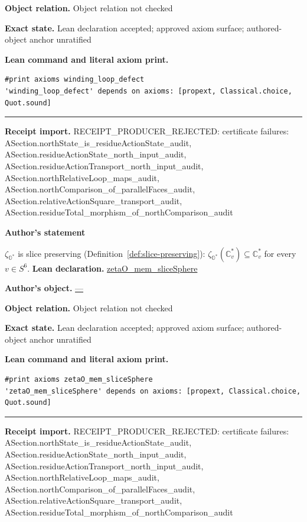 \documentclass[11pt]{article}
\newcommand{\OO}{\mathbb{O}}
\newcommand{\CC}{\mathbb{C}}
\newcommand{\Ostar}{\OO^{*}}
\newcommand{\zetaO}{\zeta_{\Ostar}}
\theoremstyle{plain}
\theoremstyle{definition}
\theoremstyle{remark}
\begin{document}
\begin{tcolorbox}
\par\textbf{Object relation.} Object relation not checked
\par\textbf{Exact state.} Lean declaration accepted; approved axiom surface; authored-object anchor unratified
\par\smallskip\textbf{Lean command and literal axiom print.}
\begin{Verbatim}[breaklines=true,breakanywhere=true,fontsize=\small]
#print axioms winding_loop_defect
'winding_loop_defect' depends on axioms: [propext, Classical.choice, Quot.sound]
\end{Verbatim}
\medskip\hrule\medskip
\textbf{Receipt import.} \textcolor{KgtRed}{RECEIPT\_PRODUCER\_REJECTED: certificate failures: ASection.northState\_is\_residueActionState\_audit, ASection.residueActionState\_north\_input\_audit, ASection.residueActionTransport\_north\_input\_audit, ASection.northRelativeLoop\_maps\_audit, ASection.northComparison\_of\_parallelFaces\_audit, ASection.relativeActionSquare\_transport\_audit, ASection.residueTotal\_morphism\_of\_northComparison\_audit}
\end{tcolorbox}
\medskip
\begin{tcolorbox}[provenancecard,title={29. Theorem - Slice preservation},title after break={29. Theorem - Slice preservation (continued)}]
\textbf{Author's statement}\par
$\zetaO$ is slice preserving (Definition~\ref{def:slice-preserving}):
$\zetaO(\CC_v^{*})\subseteq\CC_v^{*}$ for every $v\in S^6$.
\tcblower
\textbf{Lean declaration.} \url{zetaO_mem_sliceSphere}
\par\textbf{Author's object.} \url{—}
\par\textbf{Object relation.} Object relation not checked
\par\textbf{Exact state.} Lean declaration accepted; approved axiom surface; authored-object anchor unratified
\par\smallskip\textbf{Lean command and literal axiom print.}
\begin{Verbatim}[breaklines=true,breakanywhere=true,fontsize=\small]
#print axioms zetaO_mem_sliceSphere
'zetaO_mem_sliceSphere' depends on axioms: [propext, Classical.choice, Quot.sound]
\end{Verbatim}
\medskip\hrule\medskip
\textbf{Receipt import.} \textcolor{KgtRed}{RECEIPT\_PRODUCER\_REJECTED: certificate failures: ASection.northState\_is\_residueActionState\_audit, ASection.residueActionState\_north\_input\_audit, ASection.residueActionTransport\_north\_input\_audit, ASection.northRelativeLoop\_maps\_audit, ASection.northComparison\_of\_parallelFaces\_audit, ASection.relativeActionSquare\_transport\_audit, ASection.residueTotal\_morphism\_of\_northComparison\_audit}
\end{tcolorbox}
\end{document}

